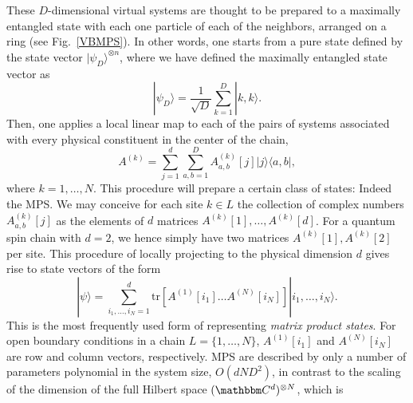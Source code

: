 \documentclass[rmp,twocolumn,floatfix,epsfig,graphics]{revtex4} %
\begin{document}
These $D$-dimensional virtual systems are thought to be prepared to 
a maximally entangled state with each one particle of each of the 
neighbors, arranged on a ring (see Fig.\ \ref{VBMPS}). In other words, 
one starts from a 
pure state defined by the state vector $|\psi_D\rangle ^{\otimes n}$, 
where we have defined the maximally entangled state vector as 
\begin{equation}\label{maxent}
        |\psi_D\rangle= \frac{1}{\sqrt{D}}\sum_{k=1}^D |k,k\rangle.
\end{equation}  
Then, one applies a local linear map to each of the pairs of 
systems associated with every physical constituent in the center 
of the chain,
\begin{equation}\label{project}
        A^{(k)}= \sum_{j=1}^d \sum_{a,b=1}^D A^{(k)}_{a,b}[j]
        |j\rangle\langle a,b|,
\end{equation}
where $k=1,\dots, N$. This procedure will prepare a certain 
class of states: Indeed the MPS. We may conceive
for each site $k\in L$ the collection of complex
numbers $A^{(k)}_{a,b}[j]$ as the elements of $d$ matrices
$A^{(k)}[1],\dots, A^{(k)}[d]$. For a quantum spin chain with
$d=2$, we hence simply  have two matrices $A^{(k)}[1],A^{(k)}[2]$ per site.
%
This procedure of locally projecting to the physical dimension $d$
gives rise to state vectors of the form
\begin{equation}\label{MPS}
        |\psi\rangle = \sum_{i_1,\dots, i_N=1}^d
        \text{tr}[A^{(1)}[i_1]\dots A^{(N)}[i_N] ]
        |i_1,\dots, i_N\rangle.
\end{equation}
This is the most frequently used form of representing
{\it matrix product states}. For open boundary conditions 
in a chain $L= \{1,\dots, N\}$, $ A^{(1)}[i_1]$ and $A^{(N)}[i_N] $ 
are row and column vectors, respectively. MPS are described 
by only a number of parameters polynomial in the system size, 
$O(d ND^2)$, in contrast to the scaling of the dimension of 
the full Hilbert space $(\cc^{d})^{\otimes N}$, which is 
\end{document}
